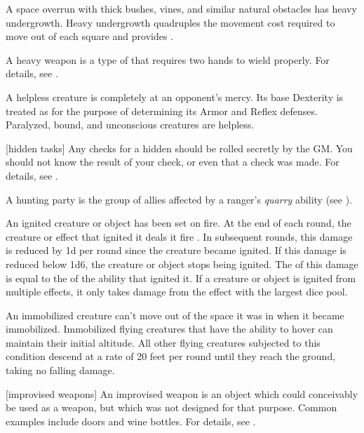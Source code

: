  A space overrun with thick bushes, vines, and similar natural obstacles has heavy undergrowth.
Heavy undergrowth quadruples the movement cost required to move out of each square and provides .

 A heavy weapon is a type of  that requires two hands to wield properly.
For details, see .

 A helpless creature is completely at an opponent's mercy.
Its base Dexterity is treated as  for the purpose of determining its Armor and Reflex defenses.
Paralyzed, bound, and unconscious creatures are helpless.

[hidden tasks] Any checks for a hidden  should be rolled secretly by the GM.\@
You should not know the result of your check, or even that a check was made.
For details, see .

 A hunting party is the group of allies affected by a ranger's \textit{quarry} ability (see ).

 An ignited creature or object has been set on fire.
At the end of each round, the creature or effect that ignited it deals it  fire .
In subsequent rounds, this damage is reduced by \minus1d per round since the creature became ignited.
If this damage is reduced below 1d6, the creature or object stops being ignited.
The  of this damage is equal to the  of the ability that ignited it.
If a creature or object is ignited from multiple effects, it only takes damage from the effect with the largest dice pool.

 An immobilized creature can't move out of the space it was in when it became immobilized.
Immobilized flying creatures that have the ability to hover can maintain their initial altitude.
All other flying creatures subjected to this condition descend at a rate of 20 feet per round until they reach the ground, taking no falling damage.

[improvised weapons] An improvised weapon is an object which could conceivably be used as a weapon, but which was not designed for that purpose.
Common examples include doors and wine bottles.
For details, see .

